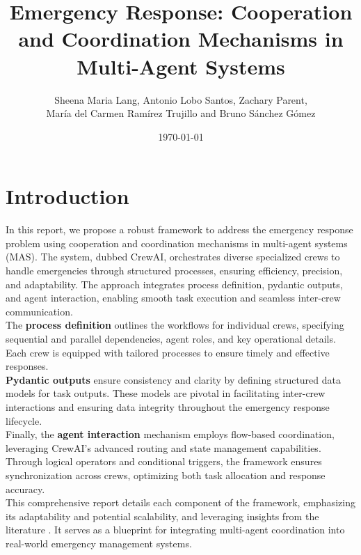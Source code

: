 \documentclass[12pt,a4paper]{article}
\title{Emergency Response: Cooperation and Coordination Mechanisms in Multi-Agent Systems}
\author{Sheena Maria Lang, Antonio Lobo Santos, Zachary Parent, \\ María del Carmen Ramírez Trujillo and Bruno Sánchez Gómez}
\date{\today}
\begin{document}
\maketitle
\tableofcontents
\newpage

\section{Introduction}
In this report, we propose a robust framework to address the emergency response problem using cooperation and coordination
 mechanisms in multi-agent systems (MAS). The system, dubbed CrewAI, orchestrates diverse specialized crews to handle emergencies
  through structured processes, ensuring efficiency, precision, and adaptability. The approach integrates process definition, 
  pydantic outputs, and agent interaction, enabling smooth task execution and seamless inter-crew communication.
\\

The \textbf{process definition} outlines the workflows for individual crews, specifying sequential and parallel dependencies, agent roles,
 and key operational details. Each crew is equipped with tailored processes to ensure timely and effective responses.
\\ 

\textbf{Pydantic outputs} ensure consistency and clarity by defining structured data models for task outputs. These models are
 pivotal in facilitating inter-crew interactions and ensuring data integrity throughout the emergency response lifecycle.
\\ 

Finally, the \textbf{agent interaction} mechanism employs flow-based coordination, leveraging CrewAI’s advanced routing and state 
management capabilities. Through logical operators and conditional triggers, the framework ensures synchronization across crews, 
optimizing both task allocation and response accuracy.
\\ 

This comprehensive report details each component of the framework, emphasizing its adaptability and potential scalability, and leveraging insights from the literature \cite{app10155335, 2009-weiss, 10.5555/1695886}. 
It serves as a blueprint for integrating multi-agent coordination into real-world emergency management systems.
\\
\end{document}
